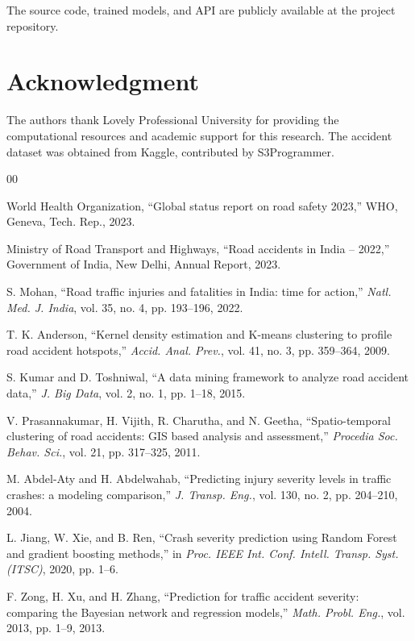 \documentclass[conference]{IEEEtran}
\begin{document}
The source code, trained models, and API are publicly available at the project repository.

\section*{Acknowledgment}

The authors thank Lovely Professional University for providing the computational resources and academic support for this research. The accident dataset was obtained from Kaggle, contributed by S3Programmer.

\begin{thebibliography}{00}

 World Health Organization, ``Global status report on road safety 2023,'' WHO, Geneva, Tech. Rep., 2023.

 Ministry of Road Transport and Highways, ``Road accidents in India -- 2022,'' Government of India, New Delhi, Annual Report, 2023.

 S. Mohan, ``Road traffic injuries and fatalities in India: time for action,'' \textit{Natl. Med. J. India}, vol. 35, no. 4, pp. 193--196, 2022.

 T. K. Anderson, ``Kernel density estimation and K-means clustering to profile road accident hotspots,'' \textit{Accid. Anal. Prev.}, vol. 41, no. 3, pp. 359--364, 2009.

 S. Kumar and D. Toshniwal, ``A data mining framework to analyze road accident data,'' \textit{J. Big Data}, vol. 2, no. 1, pp. 1--18, 2015.

 V. Prasannakumar, H. Vijith, R. Charutha, and N. Geetha, ``Spatio-temporal clustering of road accidents: GIS based analysis and assessment,'' \textit{Procedia Soc. Behav. Sci.}, vol. 21, pp. 317--325, 2011.

 M. Abdel-Aty and H. Abdelwahab, ``Predicting injury severity levels in traffic crashes: a modeling comparison,'' \textit{J. Transp. Eng.}, vol. 130, no. 2, pp. 204--210, 2004.

 L. Jiang, W. Xie, and B. Ren, ``Crash severity prediction using Random Forest and gradient boosting methods,'' in \textit{Proc. IEEE Int. Conf. Intell. Transp. Syst. (ITSC)}, 2020, pp. 1--6.

 F. Zong, H. Xu, and H. Zhang, ``Prediction for traffic accident severity: comparing the Bayesian network and regression models,'' \textit{Math. Probl. Eng.}, vol. 2013, pp. 1--9, 2013.


\end{thebibliography}
\end{document}
